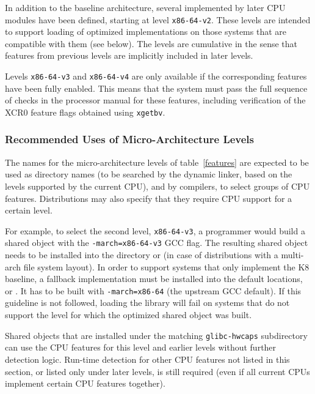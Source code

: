 In addition to the \xARCH baseline architecture, several
 implemented by later CPU modules
have been defined, starting at level \texttt{x86-64-v2}.  These levels
are intended to support loading of optimized implementations on those
systems that are compatible with them (see below).  The levels are
cumulative in the sense that features from previous levels are
implicitly included in later levels.

Levels \texttt{x86-64-v3} and \texttt{x86-64-v4} are only available if
the corresponding features have been fully enabled.  This means that
the system must pass the full sequence of checks in the processor
manual for these features, including verification of the XCR0 feature
flags obtained using \texttt{xgetbv}.

\subsubsection{Recommended Uses of Micro-Architecture Levels}

The names for the micro-architecture levels of table~\ref{features}
are expected to be used as directory names (to be searched by the
dynamic linker, based on the levels supported by the current CPU), and
by compilers, to select groups of CPU features.  Distributions may
also specify that they require CPU support for a certain level.

For example, to select the second level, \texttt{x86-64-v3}, a
programmer would build a shared object with the
\texttt{-march=x86-64-v3} GCC flag.  The resulting shared object needs
to be installed into the directory
 or
 (in case of
distributions with a multi-arch file system layout).  In order to
support systems that only implement the K8 baseline, a fallback
implementation must be installed into the default locations,
 or .  It has to be
built with \texttt{-march=x86-64} (the upstream GCC default).  If this
guideline is not followed, loading the library will fail on systems
that do not support the level for which the optimized shared object
was built.

Shared objects that are installed under the matching
\texttt{glibc-hwcaps} subdirectory can use the CPU features for this
level and earlier levels without further detection logic.  Run-time
detection for other CPU features not listed in this section, or listed
only under later levels, is still required (even if all current CPUs
implement certain CPU features together).

